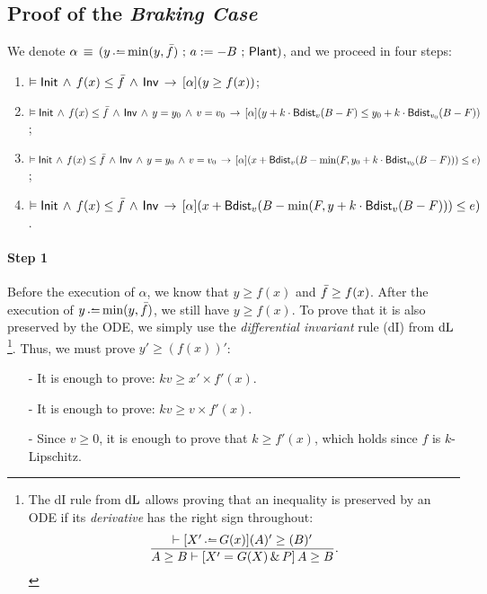 \subsection{Proof of the \emph{Braking Case}}
We denote $\alpha \,\equiv\, (y \dlassign \min(y, \TrainFxMax) \seq a:=-B \seq \Plant)$, and we proceed in four steps:
\begin{enumerate}
    \item $\vDash \mathsf{Init} \, \land \, f(x) \le \bar {f} \, \land \, \mathsf{Inv} \,\rightarrow\, [\alpha] (y \ge f(x))$;
    \item $\vDash \mathsf{Init} \, \land \, f(x) \le \bar {f} \, \land \, \mathsf{Inv} \, \land \, y = y_0 \, \land \, v = v_0 \,\rightarrow\, [\alpha] (y + k \cdot \textsf{Bdist}_{v}(B-F) \le y_0 + k \cdot \textsf{Bdist}_{v_0}(B-F))$;
    \item $\vDash \mathsf{Init} \, \land \, f(x) \le \bar {f} \, \land \, \mathsf{Inv} \, \land \, y = y_0 \, \land \, v = v_0 \,\rightarrow\, [\alpha] (x + \textsf{Bdist}_{v}(B - \min(F, y_0 + k \cdot \textsf{Bdist}_{v_0}(B-F))) \le e)$;
    \item $\vDash \mathsf{Init} \, \land \, f(x) \le \bar {f} \, \land \, \mathsf{Inv} \,\rightarrow\, [\alpha] (x + \textsf{Bdist}_{v}(B - \min(F, y + k \cdot \textsf{Bdist}_{v}(B-F))) \le e)$.
\end{enumerate}

\paragraph{Step 1} Before the execution of $\alpha$, we know that $y \ge f(x)$ and $\bar {f} \ge f(x)$. After the execution of $y \dlassign \min(y, \TrainFxMax)$, we still have $y \ge f(x)$. To prove that it is also preserved by the ODE, we simply use the \emph{differential invariant} rule (dI) from $\mathop{}\!\mathrm{d} \text{L}$\footnote{The dI rule from $\mathop{}\!\mathrm{d} \text{L}$ allows proving that an inequality is preserved by an ODE if its \emph{derivative} has the right sign throughout: \[
\frac{\vdash [X' \dlassign G(x)](A)' \ge (B)'}{A \ge B \vdash [X'=G(X) \, \& \, P] \, A \ge B}.
\]}. Thus, we must prove $y' \ge (f(x))'$:
\begin{itemize}
    \item[-] It is enough to prove: $k v \ge x' \times f'(x)$.
    \item[-] It is enough to prove: $k v \ge v \times f'(x)$.
    \item[-] Since $v \ge 0$, it is enough to prove that $k \ge f'(x)$, which holds since $f$ is $k$-Lipschitz.
\end{itemize}

